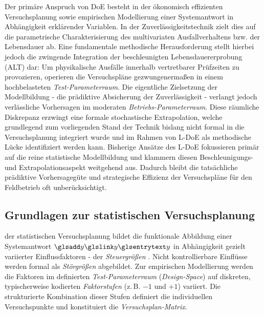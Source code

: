 Der primäre Anspruch von \ac{DoE} besteht in der ökonomisch effizienten Versuchsplanung sowie empirischen Modellierung einer Systemantwort in Abhängigkeit erklärender Variablen.
In der Zuverlässigkeitstechnik zielt dies auf die parametrische Charakterisierung des multivariaten Ausfallverhaltens bzw. der Lebensdauer ab.
Eine fundamentale methodische Herausforderung stellt hierbei jedoch die zwingende Integration der beschleunigten Lebensdauererprobung (\ac{ALT}) dar:
Um physikalische Ausfälle innerhalb vertretbarer Prüfzeiten zu provozieren, operieren die Versuchspläne gezwungenermaßen in einem hochbelasteten \textit{Test-Parameterraum}.
Die eigentliche Zielsetzung der Modellbildung - die prädiktive Absicherung der Zuverlässigkeit - verlangt jedoch verlässliche Vorhersagen im moderaten \textit{Betriebs-Parameterraum}.
Diese räumliche Diskrepanz erzwingt eine formale stochastische Extrapolation, welche grundlegend zum vorliegenden Stand der Technik bislang nicht formal in die Versuchsplanung integriert wurde und im Rahmen von \ac{L-DoE} als methodische Lücke identifiziert werden kann.
Bisherige Ansätze des \ac{L-DoE} fokussieren primär auf die reine statistische Modellbildung und klammern diesen Beschleunigungs- und Extrapolationsaspekt weitgehend aus.
Dadurch bleibt die tatsächliche prädiktive Vorhersagegüte und strategische Effizienz der Versuchspläne für den Feldbetrieb oft unberücksichtigt.

\subsection{Grundlagen zur statistischen Versuchsplanung} \label{subsec:begriffedoe}

 der statistischen Versuchsplanung bildet die funktionale Abbildung einer Systemantwort $\sym{y}$ in Abhängigkeit gezielt variierter Einflussfaktoren - der \textit{Steuergrößen} \cite{Coleman.1993,Montgomery.2020}.
Nicht kontrollierbare Einflüsse werden formal als \textit{Störgrößen} abgebildet.
Zur empirischen Modellierung werden die Faktoren im definierten \textit{Test-Parameterraum} (\textit{Design-Space}) auf diskreten, typischerweise kodierten \textit{Faktorstufen} (z.\,B. $-1$ und $+1$) variiert.
Die strukturierte Kombination dieser Stufen definiert die individuellen Versuchspunkte und konstituiert die \textit{Versuchsplan-Matrix}.

